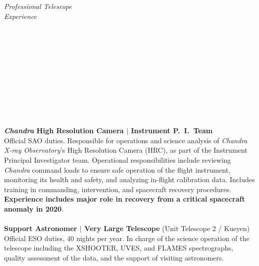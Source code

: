 \documentclass[11pt]{article}
\begin{document}
\hspace{2.5mm} \parbox{1.5in}{\textit{Professional Telescope \\ Experience \\\\\\\\\\\\\\\\\\\\\\}} \parbox{5.15in}{
\textbf{\textit{Chandra} High Resolution Camera $|$ Instrument P.~I.~Team}\\
Official SAO duties. Responsible for operations and science analysis
of \textit{Chandra X-ray Observatory}'s High Resolution Camera (HRC), as part of the Instrument Principal Investigator team. Operational responsibilities include reviewing \textit{Chandra} command loads to ensure safe operation of the flight instrument, monitoring its health and safety, and analyzing in-flight calibration data. Includes training in commanding, intervention, and spacecraft recovery procedures.
\textbf{Experience includes major role in recovery from a critical spacecraft anomaly in 2020}.
\\\\
\textbf{Support Astronomer $|$ Very Large Telescope} (Unit Telescope 2 / Kueyen)\\
Official ESO duties, 40 nights per year. In charge of the science operation of the telescope including the XSHOOTER, UVES, and FLAMES spectrographs, quality assessment of the data, and the support of visiting astronomers.
}\\



\vspace{4mm}
\end{document}
